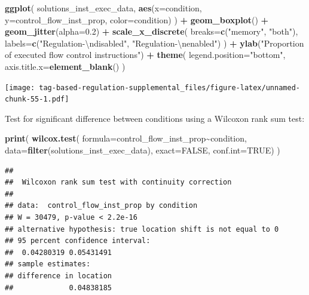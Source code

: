 \documentclass[
]{book}
\newenvironment{Shaded}{\begin{snugshade}}{\end{snugshade}}
\newcommand{\CharTok}[1]{\textcolor[rgb]{0.31,0.60,0.02}{#1}}
\newcommand{\DataTypeTok}[1]{\textcolor[rgb]{0.13,0.29,0.53}{#1}}
\newcommand{\FloatTok}[1]{\textcolor[rgb]{0.00,0.00,0.81}{#1}}
\newcommand{\KeywordTok}[1]{\textcolor[rgb]{0.13,0.29,0.53}{\textbf{#1}}}
\newcommand{\NormalTok}[1]{#1}
\newcommand{\OperatorTok}[1]{\textcolor[rgb]{0.81,0.36,0.00}{\textbf{#1}}}
\newcommand{\OtherTok}[1]{\textcolor[rgb]{0.56,0.35,0.01}{#1}}
\newcommand{\StringTok}[1]{\textcolor[rgb]{0.31,0.60,0.02}{#1}}
\begin{document}
\begin{Shaded}
\begin{Highlighting}[]
\KeywordTok{ggplot}\NormalTok{( solutions\_inst\_exec\_data, }\KeywordTok{aes}\NormalTok{(}\DataTypeTok{x=}\NormalTok{condition, }\DataTypeTok{y=}\NormalTok{control\_flow\_inst\_prop, }\DataTypeTok{color=}\NormalTok{condition) ) }\OperatorTok{+}
\StringTok{  }\KeywordTok{geom\_boxplot}\NormalTok{() }\OperatorTok{+}
\StringTok{  }\KeywordTok{geom\_jitter}\NormalTok{(}\DataTypeTok{alpha=}\FloatTok{0.2}\NormalTok{) }\OperatorTok{+}
\StringTok{  }\KeywordTok{scale\_x\_discrete}\NormalTok{(}
    \DataTypeTok{breaks=}\KeywordTok{c}\NormalTok{(}\StringTok{"memory"}\NormalTok{, }\StringTok{"both"}\NormalTok{),}
    \DataTypeTok{labels=}\KeywordTok{c}\NormalTok{(}\StringTok{"Regulation{-}}\CharTok{\textbackslash{}n}\StringTok{disabled"}\NormalTok{, }\StringTok{"Regulation{-}}\CharTok{\textbackslash{}n}\StringTok{enabled"}\NormalTok{)}
\NormalTok{  ) }\OperatorTok{+}
\StringTok{  }\KeywordTok{ylab}\NormalTok{(}\StringTok{"Proportion of executed flow control instructions"}\NormalTok{) }\OperatorTok{+}
\StringTok{  }\KeywordTok{theme}\NormalTok{(}
    \DataTypeTok{legend.position=}\StringTok{"bottom"}\NormalTok{,}
    \DataTypeTok{axis.title.x=}\KeywordTok{element\_blank}\NormalTok{()}
\NormalTok{  )}
\end{Highlighting}
\end{Shaded}

\texttt{[image: tag-based-regulation-supplemental\_files/figure-latex/unnamed-chunk-55-1.pdf]}

Test for significant difference between conditions using a Wilcoxon rank sum test:

\begin{Shaded}
\begin{Highlighting}[]
\KeywordTok{print}\NormalTok{(}
  \KeywordTok{wilcox.test}\NormalTok{(}
    \DataTypeTok{formula=}\NormalTok{control\_flow\_inst\_prop}\OperatorTok{\textasciitilde{}}\NormalTok{condition,}
    \DataTypeTok{data=}\KeywordTok{filter}\NormalTok{(solutions\_inst\_exec\_data),}
    \DataTypeTok{exact=}\OtherTok{FALSE}\NormalTok{,}
    \DataTypeTok{conf.int=}\OtherTok{TRUE}\NormalTok{)}
\NormalTok{)}
\end{Highlighting}
\end{Shaded}

\begin{verbatim}
## 
##  Wilcoxon rank sum test with continuity correction
## 
## data:  control_flow_inst_prop by condition
## W = 30479, p-value < 2.2e-16
## alternative hypothesis: true location shift is not equal to 0
## 95 percent confidence interval:
##  0.04280319 0.05431491
## sample estimates:
## difference in location 
##             0.04838185
\end{verbatim}
\end{document}

